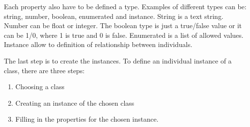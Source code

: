Each property also have to be defined a type. Examples of different types can be: string, number, boolean, enumerated and instance. String is a text string. Number can be float or integer. The boolean type is just a true/false value or it can be 1/0, where 1 is true and 0 is false. Enumerated is a list of allowed values. Instance allow to definition of relationship between individuals.

The last step is to create the instances. To define an individual instance of a class, there are three steps:
\begin{enumerate}
	\item Choosing a class
	\item Creating an instance of the chosen class
	\item Filling in the properties for the chosen instance.
\end{enumerate}
\cite{website:standford}